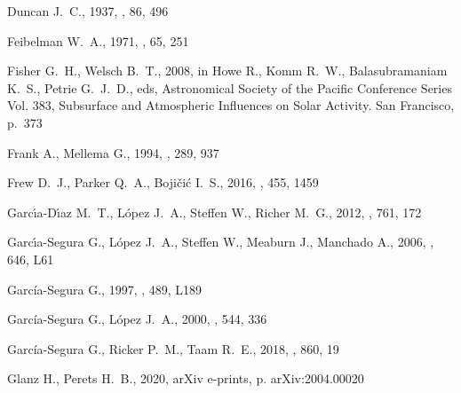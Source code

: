\documentclass[useAMS, usenatbib]{mnras}
\begin{document}
\begin{thebibliography}{}
{Duncan} J.~C.,  1937, \apj, 86, 496

{Feibelman} W.~A.,  1971, \jrasc, 65, 251

{Fisher} G.~H.,  {Welsch} B.~T.,  2008, in {Howe} R.,  {Komm} R.~W.,
  {Balasubramaniam} K.~S.,   {Petrie} G.~J.~D.,  eds,  Astronomical Society of
  the Pacific Conference Series Vol. 383, Subsurface and Atmospheric Influences
  on Solar Activity. San Francisco, p.~373

{Frank} A.,  {Mellema} G.,  1994, \aap, 289, 937

{Frew} D.~J.,  {Parker} Q.~A.,   {Bojičić} I.~S.,  2016, \mnras, 455, 1459

{Garc{\'{\i}}a-D{\'{\i}}az} M.~T.,  {López} J.~A.,  {Steffen} W.,   {Richer}
  M.~G.,  2012, \apj, 761, 172

{Garc{\'{\i}}a-Segura} G.,  {López} J.~A.,  {Steffen} W.,  {Meaburn} J.,
  {Manchado} A.,  2006, \apjl, 646, L61

{García-Segura} G.,  1997, \apjl, 489, L189

{García-Segura} G.,  {López} J.~A.,  2000, \apj, 544, 336

{García-Segura} G.,  {Ricker} P.~M.,   {Taam} R.~E.,  2018, \apj, 860, 19

{Glanz} H.,  {Perets} H.~B.,  2020, arXiv e-prints, p. arXiv:2004.00020


\end{thebibliography}
\end{document}
